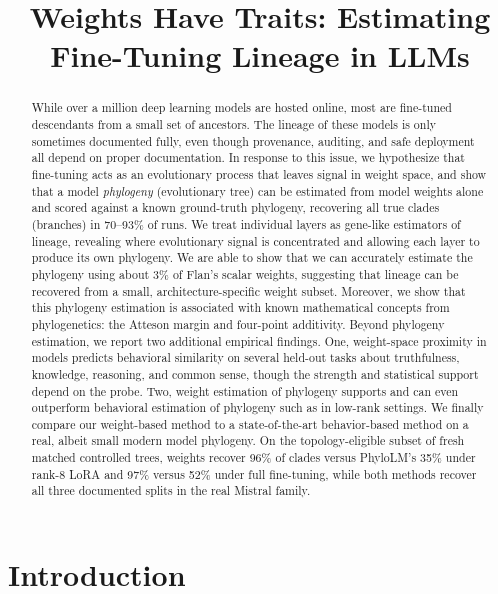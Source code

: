 \documentclass{article}
\title{Weights Have Traits: Estimating Fine-Tuning Lineage in LLMs}
\theoremstyle{definition}
\theoremstyle{plain}
\begin{document}
\maketitle

\begin{abstract}
While over a million deep learning models are hosted online, most are fine-tuned descendants from a small set of ancestors. The lineage of these models is only sometimes documented fully, even though provenance, auditing, and safe deployment all depend on proper documentation. In response to this issue, we hypothesize that fine-tuning acts as an evolutionary process that leaves signal in weight space, and show that a model \textit{phylogeny} (evolutionary tree) can be estimated from model weights alone and scored against a known ground-truth phylogeny, recovering all true clades (branches) in 70--93\% of runs. We treat individual layers as gene-like estimators of lineage, revealing where evolutionary signal is concentrated and allowing each layer to produce its own phylogeny. We are able to show that we can accurately estimate the phylogeny using about 3\% of Flan's scalar weights, suggesting that lineage can be recovered from a small, architecture-specific weight subset. Moreover, we show that this phylogeny estimation is associated with known mathematical concepts from phylogenetics: the Atteson margin and four-point additivity. Beyond phylogeny estimation, we report two additional empirical findings. One, weight-space proximity in models predicts behavioral similarity on several held-out tasks about truthfulness, knowledge, reasoning, and common sense, though the strength and statistical support depend on the probe. Two, weight estimation of phylogeny supports and can even outperform behavioral estimation of phylogeny such as in low-rank settings. We finally compare our weight-based method to a state-of-the-art behavior-based method on a real, albeit small modern model phylogeny. On the topology-eligible subset of fresh matched controlled trees, weights recover 96\% of clades versus PhyloLM's 35\% under rank-8 LoRA and 97\% versus 52\% under full fine-tuning, while both methods recover all three documented splits in the real Mistral family.

\end{abstract}

\section{Introduction}
\label{sec:intro}
\end{document}
